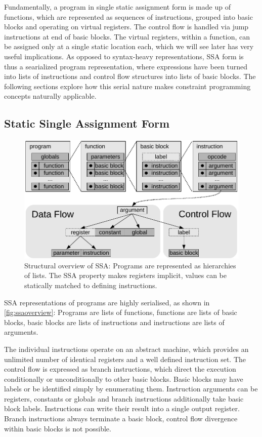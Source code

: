    Fundamentally, a program in single static assignment form is made up of
    functions, which are represented as sequences of instructions, grouped into
    basic blocks and operating on virtual registers.
    The control flow is handled via jump instructions at end of basic blocks.
    The virtual registers, within a function, can be assigned only at a single
    static location each, which we will see later has very useful implications.
    As opposed to syntax-heavy representations, SSA form is thus a searialized
    program representation, where expressions have been turned into lists of
    instructions and control flow structures into lists of basic blocks.
    The following sections explore how this serial nature makes constraint
    programming concepts naturally applicable.

\subsection{Static Single Assignment Form}

\begin{figure}[t]
\centering
\includegraphics{figures/ssaoverview}
\caption{Structural overview of SSA: Programs are represented as hierarchies of
    lists. The SSA property makes registers implicit, values can be statically
    matched to defining instructions.}
\label{fig:ssaoverview}
\end{figure}

    SSA representations of programs are highly serialised, as shown in
    \autoref{fig:ssaoverview}:
    Programs are lists of functions, functions are lists of basic blocks,
    basic blocks are lists of instructions and instructions are lists of
    arguments.

    The individual instructions operate on an abstract machine, which provides
    an unlimited number of identical registers and a well defined instruction
    set.
    The control flow is expressed as branch instructions, which direct the
    execution conditionally or unconditionally to other basic blocks.
    Basic blocks may have labels or be identified simply by enumerating them.
    Instruction arguments can be registers, constants or globals and branch
    instructions additionally take basic block labels.
    Instructions can write their result into a single output register.
    Branch instructions always terminate a basic block, control flow divergence
    within basic blocks is not possible.

